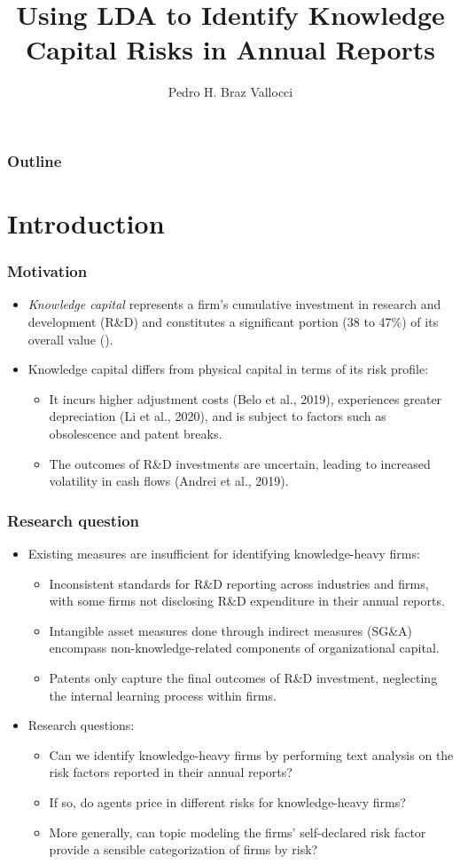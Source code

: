 \documentclass{beamer}
\title[] %
{Using LDA to Identify Knowledge Capital Risks in Annual Reports}
\author[Pedro Vallocci] %
{Pedro H. Braz Vallocci\inst{1}}
\institute[UCSC] %
{
  \inst{1}%
  University of California, Santa Cruz
 }
\begin{document}
\frame{\titlepage}

\begin{frame}
\frametitle{Outline}
\tableofcontents
\end{frame}

\section{Introduction}
\begin{frame}
\frametitle{Motivation}
\begin{itemize}	
\item \textit{Knowledge capital} represents a firm's cumulative investment in research and development (R\&D) and constitutes a significant portion (38 to 47\%) of its overall value (\cite{Belo2019-iz}).
\item Knowledge capital differs from physical capital in terms of its risk profile:
\begin{itemize}
\item It incurs higher adjustment costs (Belo et al., 2019), experiences greater depreciation (Li et al., 2020), and is subject to factors such as obsolescence and patent breaks.
\item The outcomes of R\&D investments are uncertain, leading to increased volatility in cash flows (Andrei et al., 2019).
\end{itemize}



\end{itemize}
\end{frame}


\begin{frame}
\frametitle{Research question}
  \begin{itemize}
  \item Existing measures are insufficient for identifying knowledge-heavy firms:
\begin{itemize}
\item Inconsistent standards for R\&D reporting across industries and firms, with some firms not disclosing R\&D expenditure in their annual reports.
\item Intangible asset measures done through indirect measures (SG\&A) encompass non-knowledge-related components of organizational capital.
\item Patents only capture the final outcomes of R\&D investment, neglecting the internal learning process within firms.
\end{itemize}
\item Research questions:
\begin{itemize}
\item Can we identify knowledge-heavy firms by performing text analysis on the risk factors reported in their annual reports?
\item If so, do agents price in different risks for knowledge-heavy firms?
\item More generally, can topic modeling the firms' self-declared risk factor provide a sensible categorization of firms by risk?
\end{itemize}
\end{itemize}
\end{frame}
\end{document}
